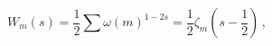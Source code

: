 \begin{equation}
W_m(s)=\frac 12 \sum \omega (m)^{1-2s} = \frac 12 \zeta_m \left(
s-\frac 12\right) \,, \label{mW}
\end{equation}


